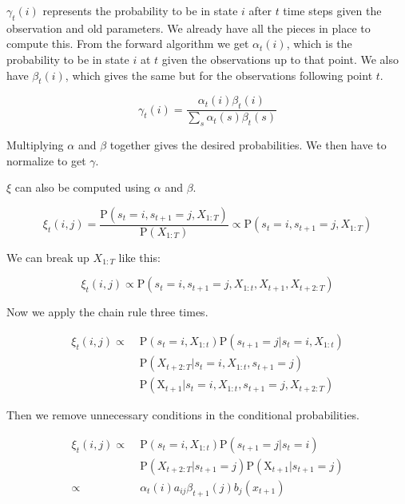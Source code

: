 $\gamma_t(i)$ represents the probability to be in state $i$ after $t$ time steps given the observation and old parameters. We already have all the pieces in place to compute this. From the forward algorithm we get $\alpha_t(i)$, which is the probability to be in state $i$ at $t$ given the observations up to that point. We also have $\beta_t(i)$, which gives the same but for the observations following point $t$.

\begin{equation}
   \gamma_t(i) = \frac{\alpha_{t}(i) \beta_{t}(i)}{\sum_{s} \alpha_{t}(s) \beta_{t}(s)}
\end{equation}

Multiplying $\alpha$ and $\beta$ together gives the desired probabilities. We then have to normalize to get $\gamma$. 

$\xi$ can also be computed using $\alpha$ and $\beta$. 

\begin{equation}
   \xi_{t}(i, j)=\frac{\mathrm{P}\left(s_{t}=i, s_{t+1}=j, X_{1: T}\right)}{\mathrm{P}\left(X_{1: T}\right)} \propto \mathrm{P}\left(s_{t}=i, s_{t+1}=j, X_{1: T}\right)
\end{equation}

We can break up $X_{1:T}$ like this:

\begin{equation}
   \xi_{t}(i, j) \propto \mathrm{P}\left(s_{t}=i, s_{t+1}=j, X_{1: t}, X_{t+1},X_{t+2:T}\right)
\end{equation}

Now we apply the chain rule three times.

\begin{equation}
  \begin{aligned}
\xi_{t}(i, j) \propto \;  &\mathrm{P}\left(s_{t}=i, X_{1: t}\right) \mathrm{P}\left(s_{t+1}=j | s_{t}=i, X_{1: t}\right) \\
&\mathrm{P}\left(X_{t+2: T} | s_{t}=i, X_{1: t}, s_{t+1}=j\right) \\
&\mathrm{P}\left(\mathrm{X}_{t+1} | s_{t}=i, X_{1: t}, s_{t+1}=j, X_{t+2: T}\right)
\end{aligned} 
\end{equation}

Then we remove unnecessary conditions in the conditional probabilities.

\begin{equation}
\begin{aligned}
\xi_{t}(i, j) \propto \; &\mathrm{P}\left(s_{t}=i, X_{1: t}\right) \mathrm{P}\left(s_{t+1}=j | s_{t}=i\right) \\
&\mathrm{P}\left(X_{t+2: T} | s_{t+1}=j\right) \mathrm{P}\left(\mathrm{X}_{t+1} | s_{t+1}=j\right) \\
\propto \;  & \alpha_{t}(i) a_{i j} \beta_{t+1}(j) b_{j}(x_{t+1})
\end{aligned} 
\end{equation}

